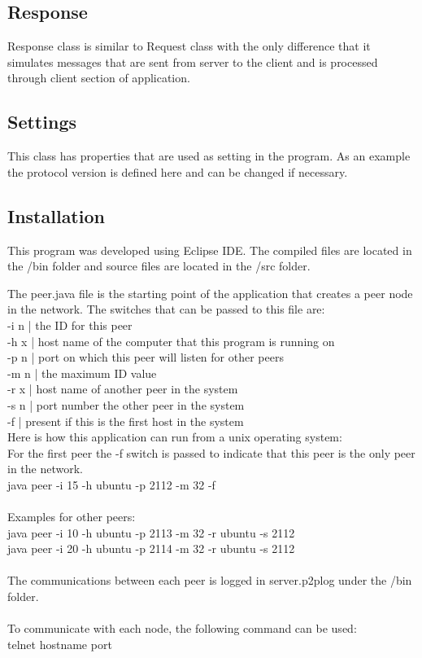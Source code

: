 \documentclass[11pt,a4paper,titlepage]{article}
\begin{document}
\subsection*{Response}
Response class is similar to Request class with the only difference that it simulates messages that are sent from server to the client and is processed through client section of application.
\subsection*{Settings} 
This class has properties that are used as setting in the program. As an example the protocol version is defined here and can be changed if necessary.

\subsection*{Installation}
This program was developed using Eclipse IDE. The compiled files are located in the /bin folder and source files are located in the /src folder.

The peer.java file is the starting point of the application that creates a peer node in the network. The switches that can be passed to this file are:\\
-i n | the ID for this peer\\
-h x | host name of the computer that this program is running on\\
-p n | port on which this peer will listen for other peers\\
-m n | the maximum ID value\\
-r x | host name of another peer in the system\\
-s n | port number the other peer in the system\\
-f | present if this is the first host in the system\\

Here is how this application can run from a unix operating system: \\

For the first peer the -f switch is passed to indicate that this peer is the only peer in the network.\\
java peer -i 15 -h ubuntu -p 2112 -m 32 -f\\
\\
Examples for other peers:\\
java peer -i 10 -h ubuntu -p 2113 -m 32 -r ubuntu -s 2112\\
java peer -i 20 -h ubuntu -p 2114 -m 32 -r ubuntu -s 2112\\
\\
The communications between each peer is logged in server.p2plog under the /bin folder.\\
\\
To communicate with each node, the following command can be used:\\
telnet hostname port\\
\end{document}
